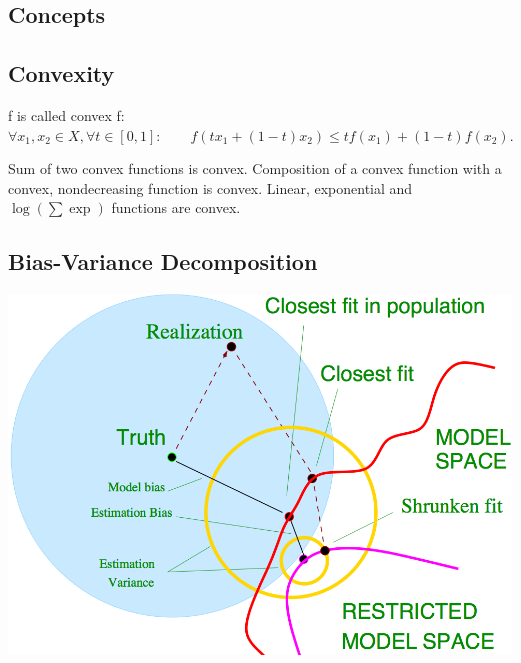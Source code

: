 \documentclass[10pt,a4paper,landscape]{article}
\renewcommand{\bf}[1]{\ensuremath{\mathbf{#1}}}
\begin{document}
\begin{multicols*}{4}
%

\section{Concepts}

\subsection{Convexity}
f is called convex f: $\forall x_1, x_2 \in X, \forall t \in [0, 1]: \qquad f(tx_1+(1-t)x_2)\leq t f(x_1)+(1-t)f(x_2).$

Sum of two convex functions is convex. Composition of a convex function with a convex, nondecreasing function is convex. Linear, exponential and $\log(\sum \exp)$ functions are convex.

\subsection{Bias-Variance Decomposition}
\begin{colfig}
  \centering
  \includegraphics[width=\linewidth]{images/bias-variance.png}
\end{colfig}


\end{multicols*}
\end{document}
